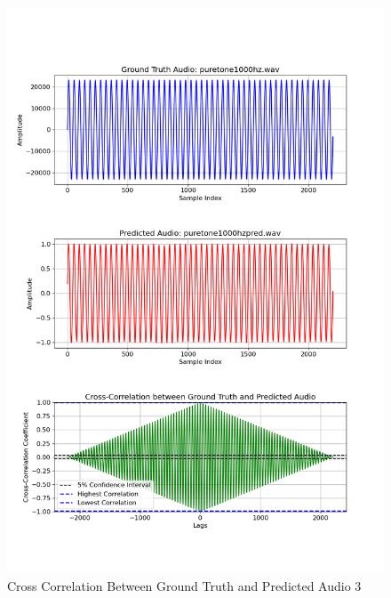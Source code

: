 \documentclass{ioereport}
\begin{document}
    \begin{figure}[H]
        \centering
        \includegraphics[width=\linewidth]{assets/crosscorrelation/cross_correlation_puretone1000hz.wav_puretone1000hzpred.wav.png}
        \caption{Cross Correlation Between Ground Truth and Predicted Audio 3}
        \label{fig:cross-correlation-3}
    \end{figure}
\end{document}

